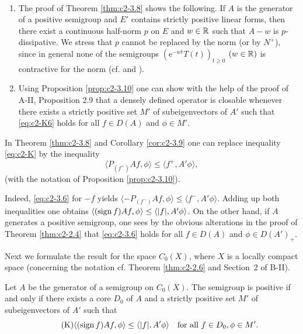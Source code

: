 \begin{remark}\label{rem:c2-3.11} ~ 
\begin{enumerate}[\upshape (i), wide, labelsep=.5em]%
\item \label{rem:c2-3.11-1}
The proof of Theorem \ref{thm:c2-3.8}   shows the following. 
If $A$ is the generator of a positive semigroup and $E'$ contains strictly
positive linear forms, then there exist a continuous half-norm $p$ on
$E$ and $w \in \mathbb{R}$ such that $A - w$ is $p$-dissipative. 
We stress that $p$ cannot be replaced by the norm (or by $N^{+}$), since in general none of the semigroups $(\mathrm{e}^{-wt}T(t))_{t \geq 0}$ $(w \in \mathbb{R})$ is contractive for the norm (cf. \citet{derndinger:1984} and \citet{battydavies:1983}).
\item  \label{rem:c2-3.11-2}
Using Proposition \ref{prop:c2-3.10}   one can show with the help of the proof of 
A-II,  Proposition 2.9 that a densely defined operator is closable whenever
there exists a strictly positive set $M'$ of subeigenvectors of $A'$
such that \eqref{eq:c2-K6}   holds for all $f \in D(A)$ and $\phi \in M'$.
\end{enumerate}
\end{remark}
\begin{remark}\label{rem:c2-3.12}
In Theorem \ref{thm:c2-3.8} and Corollary \ref{cor:c2-3.9}  one can replace inequality \eqref{eq:c2-K}   by the inequality
\begin{equation}\label{eq:c2-3.6}
\langle P_{(f^{+})}Af,\phi \rangle \leq \langle f^{+},A'\phi \rangle,
\end{equation}
(with the notation of Proposition \ref{prop:c2-3.10}).

Indeed, \eqref{eq:c2-3.6} for $-f$ yields $\langle -P_{(f^{-})}Af,\phi \rangle \leq \langle f^{-},A'\phi \rangle$. 
Adding up both inequalities one obtains $\langle(\operatorname{sign} f)Af,\phi \rangle \leq \langle |f|,A'\phi \rangle$.
On the other hand, if $A$ generates a positive semigroup, one sees by
the obvious alterations in the proof of Theorem \ref{thm:c2-2.4}   that \eqref{eq:c2-3.6} holds for all $f \in D(A)$ and $\phi \in D(A')_{+}$. 

Next we formulate the result for the space $C_{0}(X)$, where $X$ is a locally compact space (concerning the notation cf. Theorem \ref{thm:c2-2.6} and Section~2 of B-II).
\end{remark}
\begin{theorem}\label{thm:c2-3.13}
Let $A$ be the generator of a semigroup on $C_{0}(X)$.
The semigroup is positive if and only if there exists a core $D_{0}$ of
$A$ and a strictly positive set $M'$ of subeigenvectors of $A'$ such
that
\begin{equation}\label{eq:c2-K7} \tag{K}
\langle(\operatorname{sign} f)Af,\phi \rangle \leq \langle |f|,A'\phi \rangle \quad \text{for all } f \in D_{0}, \phi \in M'.
\end{equation}
\end{theorem}
